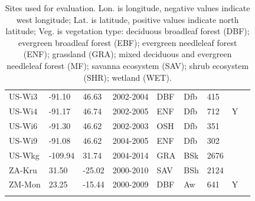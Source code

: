 \documentclass{myreport}
\begin{document}
\begin{longtable}{lllllllll}
  US-Wi3 & -91.10 & 46.63 & 2002-2004 & DBF & Dfb & 415 &  & \cite{US-Wi3} \\ 
  US-Wi4 & -91.17 & 46.74 & 2002-2005 & ENF & Dfb & 712 & Y & \cite{US-Wi4} \\ 
  US-Wi6 & -91.30 & 46.62 & 2002-2003 & OSH & Dfb & 351 &  & \cite{US-Wi6} \\ 
  US-Wi9 & -91.08 & 46.62 & 2004-2005 & ENF & Dfb & 302 &  & \cite{US-Wi9} \\ 
  US-Wkg & -109.94 & 31.74 & 2004-2014 & GRA & BSk & 2676 &  & \cite{US-Wkg} \\ 
  ZA-Kru & 31.50 & -25.02 & 2000-2010 & SAV & BSh & 2124 &  & \cite{ZA-Kru} \\ 
  ZM-Mon & 23.25 & -15.44 & 2000-2009 & DBF & Aw & 641 & Y & \cite{ZM-Mon} \\ 
  \bottomrule
\caption{Sites used for evaluation. Lon. is longitude, negative values indicate west longitude; Lat. is latitude, positive values indicate north latitude; Veg. is vegetation type: deciduous broadleaf forest (DBF); evergreen broadleaf forest (EBF); evergreen needleleaf forest (ENF); grassland (GRA); mixed deciduous and evergreen needleleaf forest (MF); savanna ecosystem (SAV); shrub ecosystem (SHR); wetland (WET).} 
\label{tab:sites}
\end{longtable}




\end{document}

